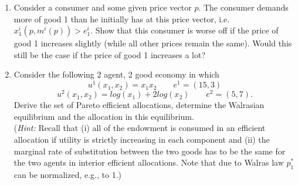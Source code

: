 \documentclass[a4paper,12pt]{article}
\begin{document}
\begin{enumerate}
\item Consider a consumer and some given price vector $p$. The consumer demands more of good 1 than he initially has at this price vector, i.e. $x^i_1(p,m^i(p))>e^i_1$. Show that this consumer is worse off if the price of good 1 increases slightly (while all other prices remain the same). Would this still be the case if the price of good 1 increases a lot?
\item Consider the following 2 agent, 2 good economy in which
  $$u^1(x_1,x_2)=x_1x_2 \qquad  e^1=(15,3)$$
  $$u^2(x_1,x_2)= log(x_1)+2 log(x_2) \qquad  e^2=(5,7).$$
  Derive the set of Pareto efficient allocations, determine the Walrasian equilibrium and the allocation in this equilibrium.\\
  (\emph{Hint:} Recall that (i) all of the endowment is consumed in an efficient allocation if utility is strictly increasing in each component and (ii) the marginal rate of substitution between the two goods has to be the same for the two agents in interior efficient allocations. Note that due to Walras law $p_1^*$ can be normalized, e.g., to 1.)
\end{enumerate}
\end{document}
